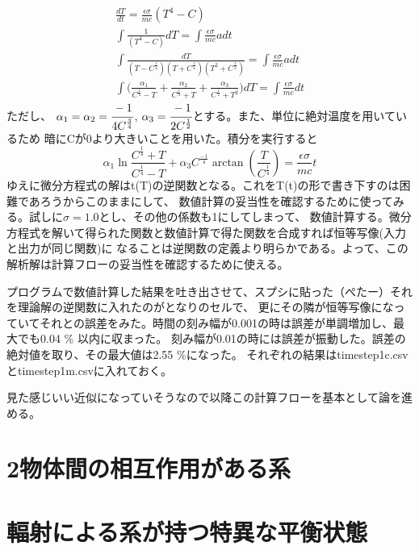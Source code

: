 \documentclass{ltjsarticle}
\begin{document}
\begin{align*}
  \frac{dT}{dt} = \frac{\epsilon \sigma}{m c}  ( T^{4} - C ) \\
  \int \frac{1}{( T^{4} -C )} dT = \int \frac{\epsilon \sigma}{m c} a dt \\
  \int \frac{dT}{( T -C^{\frac{1}{4}} )( T +C^{\frac{1}{4}} )( T^{2} +C^{\frac{1}{2}})} 
  = \int \frac{\epsilon \sigma}{m c} a dt \\
  \int \lparen \frac{\alpha_{1}}{C^{\frac{1}{4}} -T} 
              + \frac{\alpha_{2}}{C^{\frac{1}{4}} + T}
              + \frac{\alpha_{3}}{C^{\frac{1}{2}} + T^{2}} \rparen dT
  = \int \frac{\epsilon \sigma}{m c}  dt 
\end{align*}
ただし、
$\alpha_{1} =  \alpha_{2} = \cfrac{-1}{4C^{\frac{3}{4}}}$,
$\alpha_{3} = \cfrac{-1}{2C^{\frac{1}{2}}}$とする。また、単位に絶対温度を用いているため
暗にCが0より大きいことを用いた。積分を実行すると
\begin{equation*}
   \alpha_{1} \ln \frac{ C^{\frac{1}{4}} + T }
          { C^{\frac{1}{4}} - T }  + 
  \alpha_{3} C^{\frac{-1}{4}} \arctan(\frac{T}{C^{\frac{1}{4}}}) = \frac{\epsilon \sigma}{m c} t
\end{equation*}
ゆえに微分方程式の解はt(T)の逆関数となる。これをT(t)の形で書き下すのは困難であろうからこのままにして、
数値計算の妥当性を確認するために使ってみる。試しに$\sigma=1.0$とし、その他の係数も1にしてしまって、
数値計算する。微分方程式を解いて得られた関数と数値計算で得た関数を合成すれば恒等写像(入力と出力が同じ関数)に
なることは逆関数の定義より明らかである。よって、この解析解は計算フローの妥当性を確認するために使える。\par
プログラムで数値計算した結果を吐き出させて、スプシに貼った（ぺたー）それを理論解の逆関数に入れたのがとなりのセルで、
更にその隣が恒等写像になっていてそれとの誤差をみた。時間の刻み幅が0.001の時は誤差が単調増加し、最大でも0.04 \% 以内に収まった。
刻み幅が0.01の時には誤差が振動した。誤差の絶対値を取り、その最大値は2.55 \%になった。
それぞれの結果はtimestep1c.csv とtimestep1m.csvに入れておく。\par
見た感じいい近似になっていそうなので以降この計算フローを基本として論を進める。
\section{2物体間の相互作用がある系}


\section{輻射による系が持つ特異な平衡状態}

\end{document}
